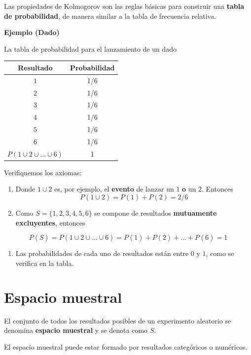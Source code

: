 \documentclass[
]{book}
\providecommand{\tightlist}{%
  \setlength{\itemsep}{0pt}\setlength{\parskip}{0pt}}
\begin{document}
Las propiedades de Kolmogorov son las reglas básicas para construir una \textbf{tabla de probabilidad}, de manera similar a la tabla de frecuencia relativa.

\textbf{Ejemplo (Dado)}

La tabla de probabilidad para el lanzamiento de un dado

\begin{longtable}[]{@{}cc@{}}
\toprule\noalign{}
Resultado & Probabilidad \\
\midrule\noalign{}
\endhead
\bottomrule\noalign{}
\endlastfoot
\(1\) & 1/6 \\
\(2\) & 1/6 \\
\(3\) & 1/6 \\
\(4\) & 1/6 \\
\(5\) & 1/6 \\
\(6\) & 1/6 \\
\(P(1 \cup 2\cup ... \cup 6)\) & 1 \\
\end{longtable}

Verifiquemos los axiomas:

\begin{enumerate}
\def\labelenumi{\arabic{enumi})}
\item
  Donde \(1 \cup 2\) es, por ejemplo, el \textbf{evento} de lanzar un \(1\) \textbf{o} un \(2\). Entonces \[P(1 \cup 2)=P(1)+P(2)=2/6\]
\item
  Como \(S=\{1,2,3,4,5,6\}\) se compone de resultados \textbf{mutuamente excluyentes}, entonces
\end{enumerate}

\[P(S)=P(1\cup 2\cup ... \cup 6) = P(1)+P(2)+ ...+P(6)=1\]

\begin{enumerate}
\def\labelenumi{\arabic{enumi})}
\setcounter{enumi}{2}
\tightlist
\item
  Las probabilidades de cada uno de resultados están entre \(0\) y \(1\), como se verifica en la tabla.
\end{enumerate}

\hypertarget{espacio-muestral}{%
\section{Espacio muestral}\label{espacio-muestral}}

El conjunto de todos los resultados posibles de un experimento aleatorio se denomina \textbf{espacio muestral} y se denota como \(S\).

El espacio muestral puede estar formado por resultados categóricos o numéricos.
\end{document}
